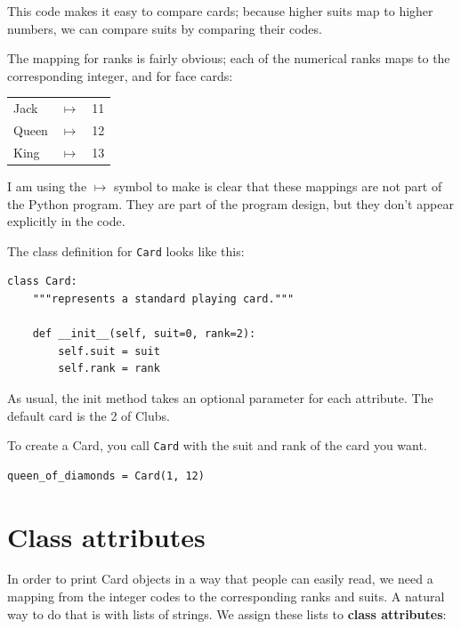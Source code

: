 \documentclass[10pt]{book}
\begin{document}
This code makes it easy to compare cards; because higher suits map to
higher numbers, we can compare suits by comparing their codes.

The mapping for ranks is fairly obvious; each of the numerical ranks
maps to the corresponding integer, and for face cards:

\beforefig
\begin{tabular}{l c l}
Jack & $\mapsto$ & 11 \\
Queen & $\mapsto$ & 12 \\
King & $\mapsto$ & 13 \\
\end{tabular}
\afterfig

I am using the $\mapsto$ symbol to make is clear that these mappings
are not part of the Python program.  They are part of the program
design, but they don't appear explicitly in the code.


The class definition for {\tt Card} looks like this:

\beforeverb
\begin{verbatim}
class Card:
    """represents a standard playing card."""

    def __init__(self, suit=0, rank=2):
        self.suit = suit
        self.rank = rank
\end{verbatim}
\afterverb
%
As usual, the init method takes an optional
parameter for each attribute.  The default card is
the 2 of Clubs.


To create a Card, you call {\tt Card} with the
suit and rank of the card you want.

\beforeverb
\begin{verbatim}
queen_of_diamonds = Card(1, 12)
\end{verbatim}
\afterverb
%


\section{Class attributes}


In order to print Card objects in a way that people can easily
read, we need a mapping from the integer codes to the corresponding
ranks and suits.  A natural way to
do that is with lists of strings.  We assign these lists to {\bf class
attributes}:
\end{document}
